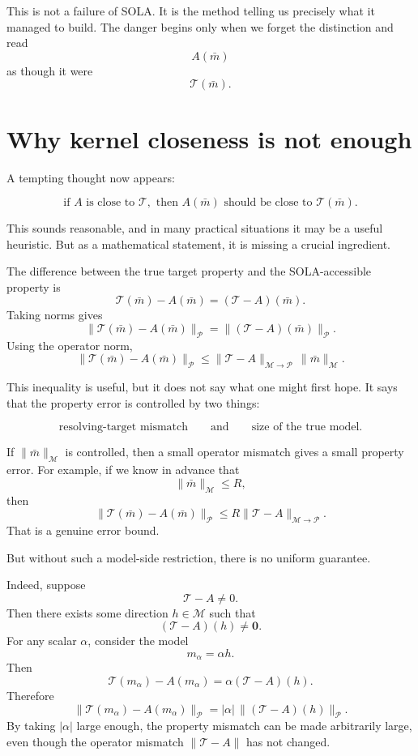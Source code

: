 \documentclass[11pt,openany]{book}
\theoremstyle{definition}
\theoremstyle{remark}
\newcommand{\M}{\mathcal M}
\newcommand{\Pspace}{\mathcal P}
\newcommand{\Tau}{\mathcal{T}}
\begin{document}
This is not a failure of SOLA. It is the method telling us precisely what it managed to build.
The danger begins only when we forget the distinction and read
\[
  A(\bar m)
\]
as though it were
\[
  \Tau(\bar m).
\]

\section{Why kernel closeness is not enough}

A tempting thought now appears:

\[
  \text{if }A\text{ is close to }\Tau,\text{ then }A(\bar m)\text{ should be close to }\Tau(\bar m).
\]

This sounds reasonable, and in many practical situations it may be a useful heuristic. But as a
mathematical statement, it is missing a crucial ingredient.

The difference between the true target property and the SOLA-accessible property is
\[
  \Tau(\bar m)-A(\bar m)
  =
  (\Tau-A)(\bar m).
\]
Taking norms gives
\[
  \|\Tau(\bar m)-A(\bar m)\|_{\Pspace}
  =
  \|(\Tau-A)(\bar m)\|_{\Pspace}.
\]
Using the operator norm,
\[
  \|\Tau(\bar m)-A(\bar m)\|_{\Pspace}
  \le
  \|\Tau-A\|_{\M\to\Pspace}\,\|\bar m\|_{\M}.
\]

This inequality is useful, but it does not say what one might first hope. It says that the
property error is controlled by two things:

\[
  \text{resolving-target mismatch}
  \qquad\text{and}\qquad
  \text{size of the true model}.
\]

If \(\|\bar m\|_{\M}\) is controlled, then a small operator mismatch gives a small property error.
For example, if we know in advance that
\[
  \|\bar m\|_{\M}\le R,
\]
then
\[
  \|\Tau(\bar m)-A(\bar m)\|_{\Pspace}
  \le
  R\|\Tau-A\|_{\M\to\Pspace}.
\]
That is a genuine error bound.

But without such a model-side restriction, there is no uniform guarantee.

Indeed, suppose
\[
  \Tau-A\neq 0.
\]
Then there exists some direction \(h\in\M\) such that
\[
  (\Tau-A)(h)\neq \mathbf 0.
\]
For any scalar \(\alpha\), consider the model
\[
  m_\alpha=\alpha h.
\]
Then
\[
  \Tau(m_\alpha)-A(m_\alpha)
  =
  \alpha(\Tau-A)(h).
\]
Therefore
\[
  \|\Tau(m_\alpha)-A(m_\alpha)\|_{\Pspace}
  =
  |\alpha|\,\|(\Tau-A)(h)\|_{\Pspace}.
\]
By taking \(|\alpha|\) large enough, the property mismatch can be made arbitrarily large, even
though the operator mismatch \(\|\Tau-A\|\) has not changed.
\end{document}
